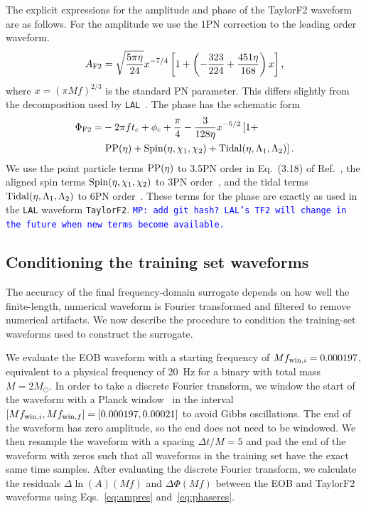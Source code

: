 \documentclass[prd,aps,letter,twocolumn,floatfix,notitlepage,nofootinbib]{revtex4-1}
\newcommand{\MP}[1]{{\textcolor{blue}{\texttt{MP: #1}} }}
\begin{document}
The explicit expressions for the amplitude and phase of the TaylorF2 waveform are as follows. For the amplitude we use the 1PN correction to the leading order waveform.
\begin{equation}
A_{\rm F2} = \sqrt{\frac{5\pi\eta}{24}} x^{-7/4} \left[ 1 + \left(-\frac{323}{224} + \frac{451\eta}{168} \right)x \right],
\end{equation}
where $x=(\pi M f)^{2/3}$ is the standard PN parameter. This differs slightly from the decomposition used by \texttt{LAL}~\cite{lal}. The phase has the schematic form
\begin{align}
\Phi_{\rm F2} =& -2\pi f t_c + \phi_c + \frac{\pi}{4} - \frac{3}{128\eta}x^{-5/2} \left[1 + \right. \\
                        & \left. {\rm PP}(\eta) + {\rm Spin}(\eta, \chi_1, \chi_2) + {\rm Tidal}(\eta, \Lambda_1, \Lambda_2)  \right].
\end{align}
We use the point particle terms ${\rm PP}(\eta)$ to 3.5PN order in Eq.~(3.18) of Ref.~\cite{BuonannoIyerOchsner2009}, the aligned spin terms ${\rm Spin}(\eta, \chi_1, \chi_2)$ to 3PN order~\cite{BoheMarsatBlanchet2013}, and the tidal terms ${\rm Tidal}(\eta, \Lambda_1, \Lambda_2)$ to 6PN order~\cite{VinesFlanaganHinderer2011}. These terms for the phase are exactly as used in the \texttt{LAL} waveform \texttt{TaylorF2}. \MP{add git hash? LAL's TF2 will change in the future when new terms become available.}


\subsection{Conditioning the training set waveforms}
\label{sec:condition}

The accuracy of the final frequency-domain surrogate depends on how well the finite-length, numerical waveform is Fourier transformed and filtered to remove numerical artifacts. We now describe the procedure to condition the training-set waveforms used to construct the surrogate.

We evaluate the EOB waveform with a starting frequency of $Mf_{{\rm win}, i}=0.000197$, equivalent to a physical frequency of 20~Hz for a binary with total mass $M=2M_\odot$. In order to take a discrete Fourier transform, we window the start of the waveform with a Planck window~\cite{McKechanRobinsonSathyaprakash2010} in the interval $[Mf_{{\rm win}, i}, Mf_{{\rm win}, f}] = [0.000197, 0.00021]$ to avoid Gibbs oscillations. The end of the waveform has zero amplitude, so the end does not need to be windowed. We then resample the waveform with a spacing $\Delta t/M = 5$ and pad the end of the waveform with zeros such that all waveforms in the training set have the exact same time samples. After evaluating the discrete Fourier transform, we calculate the residuals $\Delta\ln(A)(Mf)$ and $\Delta\Phi(Mf)$ between the EOB and TaylorF2 waveforms using Eqs.~\eqref{eq:ampres} and~\eqref{eq:phaseres}. 
\end{document}
